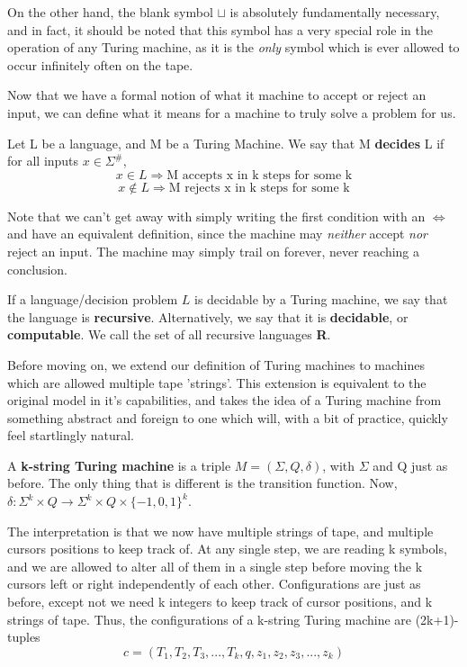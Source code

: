 On the other hand, the blank symbol $\sqcup$ is absolutely fundamentally necessary, and in fact, it should be noted that this symbol has a very special role in the operation of any Turing machine, as it is the \textit{only} symbol which is ever allowed to occur infinitely often on the tape.

Now that we have a formal notion of what it machine to accept or reject an input, we can define what it means for a machine to truly solve a problem for us.
\begin{definition}
Let L be a language, and M be a Turing Machine. We say that M \textbf{decides} L if for all inputs $x\in\Sigma^\#$,
\[x\in L \Rightarrow \textrm{M accepts x in k steps for some k} \]
\[x \notin L \Rightarrow \textrm{M rejects x in k steps for some k}\]
\end{definition}
Note that we can't get away with simply writing the first condition with an $\iff$ and have an equivalent definition, since the machine may \textit{neither} accept \textit{nor} reject an input. The machine may simply trail on forever, never reaching a conclusion.
\begin{definition}
    If a language/decision problem $L$ is decidable by a Turing machine, we say that the language is \textbf{recursive}. Alternatively, we say that it is \textbf{decidable}, or \textbf{computable}. We call the set of all recursive languages \textbf{R}.
\end{definition}
Before moving on, we extend our definition of Turing machines to machines which are allowed multiple tape 'strings'. This extension is equivalent to the original model in it's capabilities, and takes the idea of a Turing machine from something abstract and foreign to one which will, with a bit of practice, quickly feel startlingly natural.
\begin{definition}
A \textbf{k-string Turing machine} is a triple $M=(\Sigma,Q,\delta)$, with $\Sigma$ and Q just as before. The only thing that is different is the transition function. Now, $\delta: \Sigma^k \times Q \to \Sigma^k \times Q \times \{-1,0,1\}^k$.
\end{definition}
The interpretation is that we now have multiple strings of tape, and multiple cursors positions to keep track of. At any single step, we are reading k symbols, and we are allowed to alter all of them in a single step before moving the k cursors left or right independently of each other. Configurations are just as before, except not we need k integers to keep track of cursor positions, and k strings of tape. Thus, the configurations of a k-string Turing machine are (2k+1)-tuples
\[c=(T_1,T_2,T_3,...,T_k,q,z_1,z_2,z_3,...,z_k) \]


